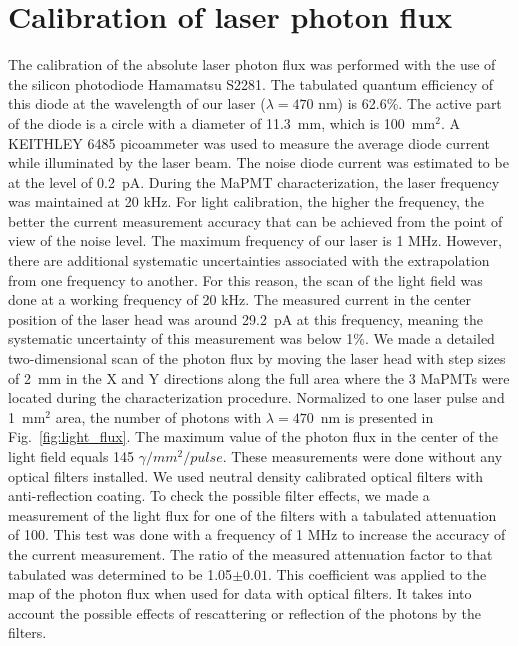 \section{Calibration of laser photon flux}

The calibration of the absolute laser photon flux was performed with the use of the silicon photodiode Hamamatsu S2281.
The tabulated quantum efficiency of this diode at the wavelength of our laser ($\lambda=470$ nm) is 62.6\%. 
The active part of the diode is a circle with a diameter of 11.3~mm, which is 100~mm$^2$. 
A KEITHLEY 6485 picoammeter was used to measure the average diode current while illuminated by the laser beam.
The noise diode current was estimated to be at the level of 0.2~pA. 
During the MaPMT characterization, the laser frequency was maintained at 20 kHz. 
For light calibration, the higher the frequency, the better the current measurement accuracy that can be achieved from the point of view of the noise level. 
The maximum frequency of our laser is 1 MHz.
However, there are additional systematic uncertainties associated with the extrapolation from one frequency to another. 
For this reason, the scan of the light field was done at a working frequency of 20 kHz. 
The measured current in the center position of the laser head was around 29.2~pA at this frequency, meaning the systematic uncertainty
of this measurement was below 1\%.  We made a detailed two-dimensional scan of the photon flux by
moving the laser head with step sizes of 2~mm in the X and Y directions along the full area where the 3 MaPMTs were located during the characterization procedure.
Normalized to one laser pulse and 1~mm$^2$ area, the number of photons with $\lambda=470$~nm  is presented in Fig.~\ref{fig:light_flux}.
The maximum value of the photon flux in the center of the light field equals 145 $\gamma/mm^2/pulse$.
These measurements were done without  any optical filters installed. We used neutral density calibrated optical filters with anti-reflection coating.
To check the possible filter effects, we made a measurement of the light flux for one of the filters with a tabulated attenuation of 100. 
This test was done with a frequency of 1 MHz to increase the accuracy of the current measurement. 
The ratio of the measured attenuation factor to that tabulated was determined to be 1.05$\pm 0.01$. This coefficient was applied to the map of the photon flux when used for data with optical filters. It takes into account the possible effects of rescattering or reflection of the photons by the filters.
